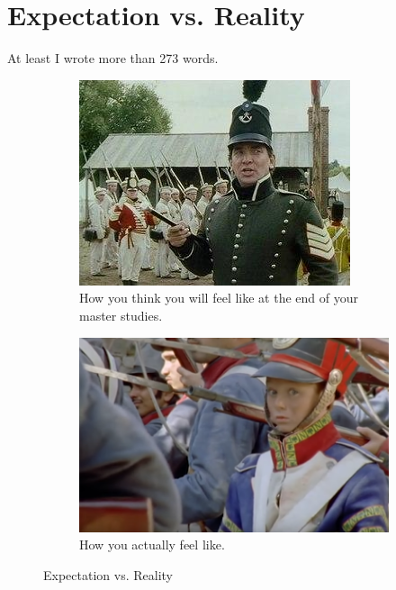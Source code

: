 \section{Expectation vs. Reality}
At least I wrote more than 273 words.
\begin{figure}[tbh]
     \centering
     \begin{subfigure}{0.7\textwidth}
         \centering
         \includegraphics[width=\textwidth]{chap/06-conclusion/img/harper}
         \caption{How you think you will feel like at the end of your master studies.}
         \label{fig:expectation}
     \end{subfigure}
     
     \begin{subfigure}{0.7\textwidth}
         \centering
         \includegraphics[width=\textwidth]{chap/06-conclusion/img/bubi}
         \caption{How you actually feel like.}
         \label{fig:reality}
     \end{subfigure}
     \caption{Expectation vs. Reality}
\end{figure}



